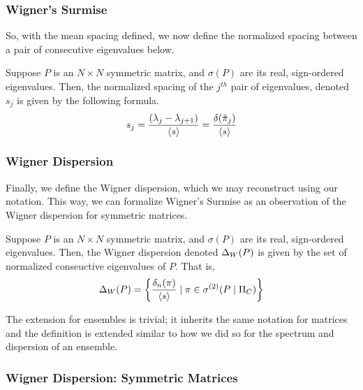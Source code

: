 \begin{frame} \frametitle{Wigner's Surmise}

\noindent So, with the mean spacing defined, we now define the normalized spacing between a pair of consecutive eigenvalues below.

\begin{alertblock}{}
Suppose $P$ is an $N \times N$ symmetric matrix, and $\sigma(P)$ are its real, sign-ordered eigenvalues.
Then, the normalized spacing of the $j^{th}$ pair of eigenvalues, denoted $s_j$ is given by the following formula.
$$s_j = \frac{(\lambda_j - \lambda_{j+1})}{{\langle s \rangle}} = \frac{\delta({\tilde{\pi}}_{j})}{\langle s \rangle}$$
\end{alertblock}

\end{frame}


\begin{frame} \frametitle{Wigner Dispersion}

Finally, we define the Wigner dispersion, which we may reconstruct using our notation. This way, we can formalize Wigner's Surmise as
an observation of the Wigner dispersion for symmetric matrices.

\begin{alertblock}{}
Suppose $P$ is an $N \times N$ symmetric matrix, and $\sigma(P)$ are its real, sign-ordered eigenvalues.
Then, the Wigner dispersion denoted $\Delta_{W}(P)$ is given by the set of normalized conseuctive eigenvalues of $P$. That is,
$$ \Delta_{W}(P) = \left\{ \frac{\delta_n(\pi)}{{\langle s \rangle}} \mid \pi \in {\sigma^{(2)}}(P \mid \Pi_C) \right\} $$
\end{alertblock}

The extension for ensembles is trivial; it inherits the same notation for matrices and the definition is extended similar to how we
did so for the spectrum and dispersion of an ensemble.

\end{frame}


\begin{frame} \frametitle{Wigner Dispersion: Symmetric Matrices}


\end{frame}

